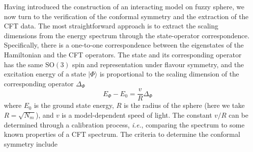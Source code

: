 \documentclass{timesjhep}
\begin{document}
Having introduced the construction of an interacting model on fuzzy sphere, we now turn to the verification of the conformal symmetry and the extraction of the CFT data. The most straightforward approach is to extract the scaling dimensions from the energy spectrum through the state-operator correspondence. Specifically, there is a one-to-one correspondence between the eigenstates of the Hamiltonian and the CFT operators. The state and its corresponding operator has the same $\mathrm{SO}(3)$ spin and representation under flavour symmetry, and the excitation energy of a state $|\Phi\rangle$ is proportional to the scaling dimension of the corresponding operator $\Delta_\Phi$ 
\begin{equation}
    E_\Phi-E_0=\frac{v}{R}\Delta_\Phi
\end{equation}
where $E_0$ is the ground state energy, $R$ is the radius of the sphere (here we take $R=\sqrt{N_m}$), and $v$ is a model-dependent speed of light. The constant $v/R$ can be determined through a calibration process, \textit{i.e.}, comparing the spectrum to some known properties of a CFT spectrum. The criteria to determine the conformal symmetry include 
\end{document}
